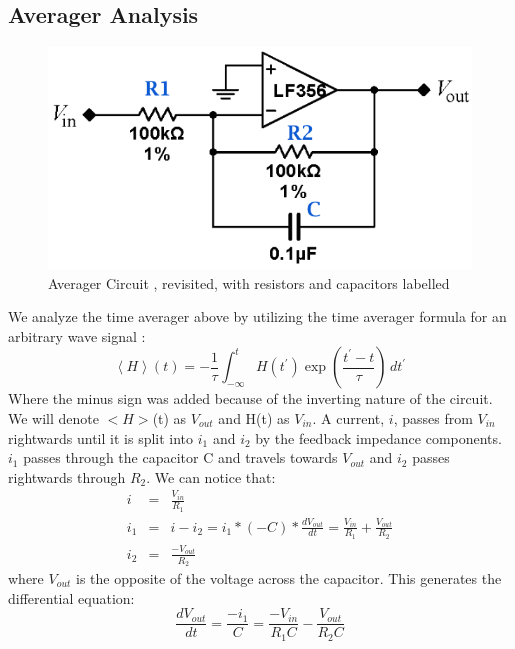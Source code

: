 \documentclass{article}
\begin{document}
    \subsection{Averager Analysis}
    \begin{figure}[H]
        \centering
        \includegraphics[scale = 0.6]{17.png}
        \caption{Averager Circuit \cite{lab7}, revisited, with resistors and capacitors labelled}
        \label{fig:my_label}
    \end{figure}
    We analyze the time averager above by utilizing the time averager formula for an arbitrary wave signal \cite{lab7}:
    \begin{equation}
        \displaystyle\left<H\right>(t)=-\frac{1}{\tau}\int_{-\infty}^{t}H(t^\prime)\exp\left(\frac{t^\prime-t}{\tau}\right)\,dt^\prime
    \end{equation}
     Where the minus sign was added because of the inverting nature of the circuit. We will denote $<H>$(t) as $V_{out}$ and H(t) as $V_{in}$. A current, $\mathit{i}$, passes from $V_{in}$ rightwards until it is split into $i_1$ and $i_2$ by the feedback impedance components. $i_1$ passes through the capacitor C and travels towards $V_{out}$ and $i_2$ passes rightwards through $R_2$. We can notice that:
    \begin{equation}
        \begin{array}{lll}
            i & = & \frac{V_{in}}{R_1}  \\
            i_1 & = & i - i_2 = i_1*(-C) * \frac{dV_{out}}{dt} = \frac{V_{in}}{R_1} + \frac{V_{out}}{R_2} \\
            i_2 & = & \frac{-V_{out}}{R_2}
        \end{array}
    \end{equation}
    where $V_{out}$ is the opposite of the voltage across the capacitor. This generates the differential equation:
    \begin{equation}
        \frac{dV_{out}}{dt} = \frac{-i_1}{C} = \frac{-V_{in}}{R_1 C} - \frac{V_{out}}{R_2 C}
    \end{equation}
\end{document}
